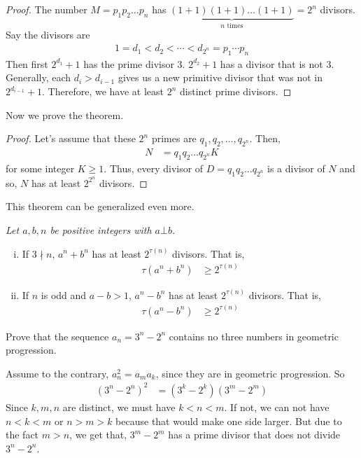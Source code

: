 \documentclass{subfile}
\begin{document}
		\begin{proof}
			The number $M=p_1p_2\dots p_n$ has $\underbrace{(1+1)(1+1)\dots(1+1)}_{n\text{ times}}=2^n$ divisors. Say the divisors are
				\begin{align*}
					1=d_1<d_2<\cdots<d_{2^n}=p_1\cdots p_n
				\end{align*}
			Then first $2^{d_1}+1$ has the prime divisor $3$. $2^{d_2}+1$ has a divisor that is not $3$. Generally, each $d_i>d_{i-1}$ gives us a new primitive divisor that was not in $2^{d_{i-1}}+1$. Therefore, we have at least $2^n$ distinct prime divisors.
		\end{proof}
	Now we prove the theorem.
		\begin{proof}
			Let's assume that these $2^n$ primes are $q_1, q_2, \dots, q_{2^n}$. Then,
				\begin{align*}
					N & = q_1q_2\dots q_{2^n}K
				\end{align*}
			for some integer $K\geq1$. Thus, every divisor of $D=q_1q_2\dots q_{2^n}$ is a divisor of $N$ and so, $N$ has at least $2^{2^n}$ divisors.
		\end{proof}
	This theorem can be generalized even more.
		\begin{theorem}\slshape
			Let $a,b,n$ be positive integers with $a\bot b$.
				\begin{enumerate}[i.]
					\item If $3\nmid n$, $a^n+b^n$ has at least $2^{\tau(n)}$ divisors. That is,
						\begin{align*}
							\tau(a^n+b^n) &\geq2^{\tau(n)}
						\end{align*}
					\item If $n$ is odd and $a-b>1$, $a^n-b^n$ has at least $2^{\tau(n)}$ divisors. That is,
						\begin{align*}
							\tau(a^n-b^n) & \geq2^{\tau(n)}
						\end{align*}
				\end{enumerate}
		\end{theorem}

		\begin{problem}
			Prove that the sequence $a_n = 3^n - 2^n$ contains no three numbers in geometric progression.
		\end{problem}

		\begin{solution}
			Assume to the contrary, $a_n^2=a_ma_k$, since they are in geometric progression. So
				\begin{align*}
					(3^n-2^n)^2 & = (3^k-2^k)(3^m-2^m)
				\end{align*}
			Since $k,m,n$ are distinct, we must have $k<n<m$. If not, we can not have $n<k<m$ or $n>m>k$ because that would make one side larger. But due to the fact $m>n$, we get that, $3^m-2^m$ has a prime divisor that does not divide $3^n-2^n$.
		\end{solution}
\end{document}
